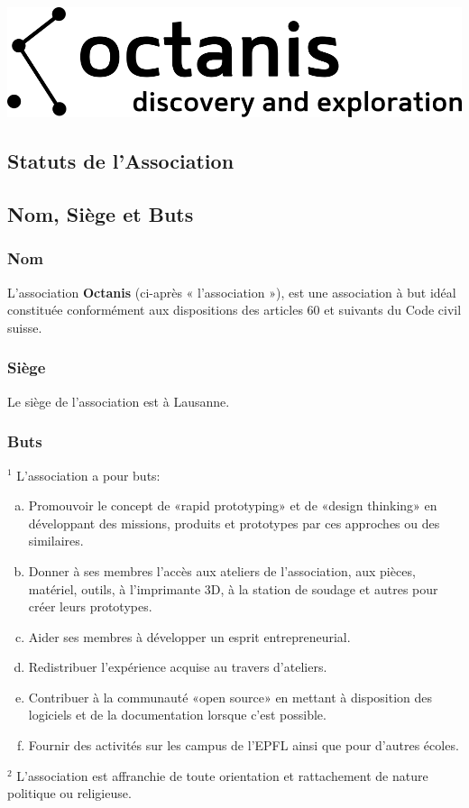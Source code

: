 \documentclass[12pt,a4paper,oneside]{article}
\newcounter{art}
\newcommand{\french}{    \switchcolumn[1]\noindent}
\newcounter{para}
\begin{document}
\begin{center}
	\includegraphics{octanis_org_logo_large}
\end{center}

\begin{paracol}{2}\sloppy

\french
	\section*{Statuts de l’Association}


\french
	\subsection{Nom, Siège et Buts}
	\subsubsection{Nom}
	L’association \textbf{Octanis} (ci-après « l’association »), est une association à but idéal constituée conformément aux dispositions des articles 60 et suivants du Code civil suisse.


\french
	\subsubsection{Siège}
	Le siège de l’association est à Lausanne.


\french
	\subsubsection{Buts}
	$^1$ L’association a pour buts:
	\begin{enumerate}[(a)]
		\item Promouvoir le concept de «rapid prototyping» et de «design thinking» en développant des missions, produits et prototypes par ces approches ou des similaires.
		\item Donner à ses membres l’accès aux ateliers de l’association, aux pièces, matériel, outils, à l’imprimante 3D, à la station de soudage et autres pour créer leurs prototypes. 
		\item Aider ses membres à développer un esprit entrepreneurial.
		\item Redistribuer l’expérience acquise au travers d’ateliers.
		\item Contribuer à la communauté «open source» en mettant à disposition des logiciels et de la documentation lorsque c’est possible.
		\item Fournir des activités sur les campus de l’EPFL ainsi que pour d’autres écoles.
	\end{enumerate} 
	$^2$ L’association est affranchie de toute orientation et rattachement de nature politique ou religieuse.


\end{paracol}
\end{document}
